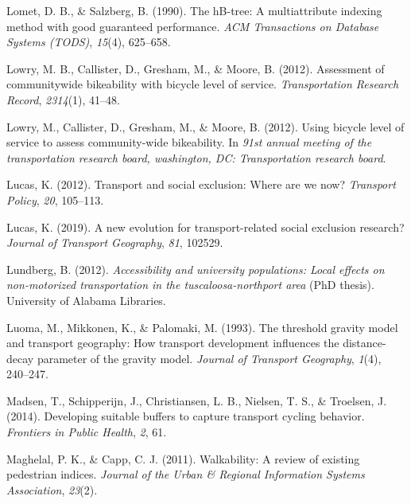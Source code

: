 \documentclass[
11pt, %
oneside, %
english, %
singlespacing, %
]{macthesis} %
\newlength{\cslhangindent}
\newenvironment{CSLReferences}[2] %
 {%
  \setlength{\parindent}{0pt}
  \ifodd #1 \everypar{\setlength{\hangindent}{\cslhangindent}}\ignorespaces\fi
  \ifnum #2 > 0
  \setlength{\parskip}{#2\baselineskip}
  \fi
 }%
 {}
\begin{document}
\begin{CSLReferences}{1}{0}
\leavevmode{}%
Lomet, D. B., \& Salzberg, B. (1990). The hB-tree: A multiattribute indexing method with good guaranteed performance. \emph{ACM Transactions on Database Systems (TODS)}, \emph{15}(4), 625--658.

\leavevmode{}%
Lowry, M. B., Callister, D., Gresham, M., \& Moore, B. (2012). Assessment of communitywide bikeability with bicycle level of service. \emph{Transportation Research Record}, \emph{2314}(1), 41--48.

\leavevmode{}%
Lowry, M., Callister, D., Gresham, M., \& Moore, B. (2012). Using bicycle level of service to assess community-wide bikeability. In \emph{91st annual meeting of the transportation research board, washington, DC: Transportation research board}.

\leavevmode{}%
Lucas, K. (2012). Transport and social exclusion: Where are we now? \emph{Transport Policy}, \emph{20}, 105--113.

\leavevmode{}%
Lucas, K. (2019). A new evolution for transport-related social exclusion research? \emph{Journal of Transport Geography}, \emph{81}, 102529.

\leavevmode{}%
Lundberg, B. (2012). \emph{Accessibility and university populations: Local effects on non-motorized transportation in the tuscaloosa-northport area} (PhD thesis). University of Alabama Libraries.

\leavevmode{}%
Luoma, M., Mikkonen, K., \& Palomaki, M. (1993). The threshold gravity model and transport geography: How transport development influences the distance-decay parameter of the gravity model. \emph{Journal of Transport Geography}, \emph{1}(4), 240--247.

\leavevmode{}%
Madsen, T., Schipperijn, J., Christiansen, L. B., Nielsen, T. S., \& Troelsen, J. (2014). Developing suitable buffers to capture transport cycling behavior. \emph{Frontiers in Public Health}, \emph{2}, 61.

\leavevmode{}%
Maghelal, P. K., \& Capp, C. J. (2011). Walkability: A review of existing pedestrian indices. \emph{Journal of the Urban \& Regional Information Systems Association}, \emph{23}(2).


\end{CSLReferences}
\end{document}
